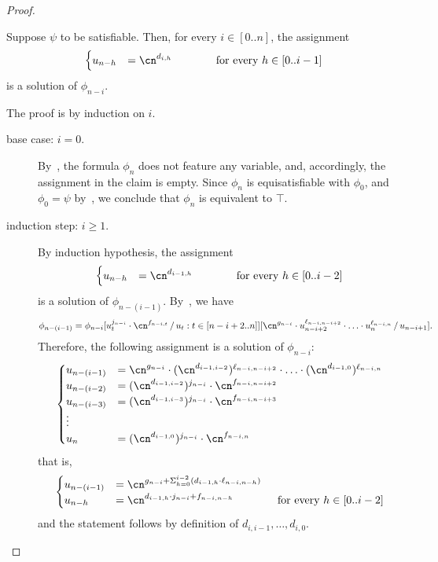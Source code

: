 \begin{proof}
  \begin{claim}\label{claim:quantifier-relativisation}
    Suppose $\psi$ to be satisfiable. Then,
    for every $i \in [0..n]$, the assignment 
    \[ 
      \begin{cases}
        u_{n-h} &= \cn^{d_{i,h}} \qquad\qquad\text{for every } h \in [0..i-1]
      \end{cases}
    \]
    is a solution of $\phi_{n-i}$.
  \end{claim}

  \begin{claimproof}
    The proof is by induction on $i$. 

    \begin{description}
      \item[base case: $i = 0$.]
      By~, the formula $\phi_n$ does not feature any variable,
      and, accordingly, the assignment in the claim is empty. Since $\phi_n$ is
      equisatisfiable with $\phi_0$, and $\phi_0 = \psi$ by~, we
      conclude that $\phi_n$ is equivalent to $\top$.
      
      \item[induction step: $i \geq 1$.] 
      By induction hypothesis, the assignment 
      \[ 
        \begin{cases}
          u_{n-h} &= \cn^{d_{i-1,h}} \qquad\qquad\text{for every } h \in [0..i-2]
        \end{cases}
      \]
      is a solution of $\phi_{n-(i-1)}$. By~, we have 
      \[ 
        \phi_{n-(i-1)} = \phi_{n-i}\sub{u_t^{j_{n-i}} \cdot
          \cn^{f_{{n-i},t}}}{u_t : t \in [{n-i}+2..n]}\sub{\cn^{g_{n-i}} \cdot
          u_{{n-i}+2}^{\ell_{{n-i},{n-i}+2}} \cdot \ldots \cdot
          u_{n}^{\ell_{{n-i},n}}}{u_{{n-i}+1}}.
      \]
      Therefore, the following assignment is a solution of $\phi_{n-i}$:
      \[ 
        \begin{cases}
          u_{n-(i-1)} &= \cn^{g_{n-i}} \cdot (\cn^{d_{i-1,i-2}})^{\ell_{{n-i},{n-i}+2}} \cdot \ldots \cdot (\cn^{d_{i-1,0}})^{\ell_{{n-i},n}}\\
          u_{n-(i-2)} &= (\cn^{d_{i-1,i-2}})^{j_{n-i}} \cdot \cn^{f_{n-i,n-i+2}}\\ 
          u_{n-(i-3)} &= (\cn^{d_{i-1,i-3}})^{j_{n-i}} \cdot \cn^{f_{n-i,n-i+3}}\\ 
          \vdots\\
          u_n &= (\cn^{d_{i-1,0}})^{j_{n-i}} \cdot \cn^{f_{n-i,n}}
        \end{cases}
      \]
      that is,
      \[ 
        \begin{cases}
          u_{n-(i-1)} &= \cn^{g_{n-i}+\Sigma_{h=0}^{i-2} (d_{i-1,h} \cdot \ell_{n-i,n-h})}\\
          u_{n-h} &= \cn^{d_{i-1,h} \cdot j_{n-i}+f_{n-i,n-h}} \qquad\qquad\text{for every } h \in [0..i-2]
        \end{cases}
      \]
      and the statement follows by definition of $d_{i,i-1},\dots,d_{i,0}$.
      \claimqedhere%
    \end{description}
  \end{claimproof}


\end{proof}

